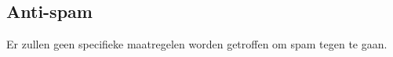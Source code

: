\subsection{Anti-spam}\label{antispam}

Er zullen geen specifieke maatregelen worden getroffen om spam tegen te gaan. 
